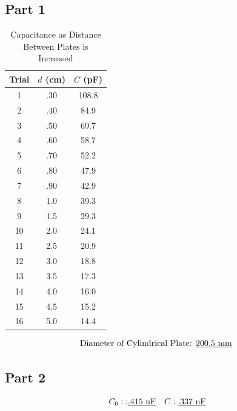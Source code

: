 \documentclass[twocolumn,english]{IEEEtran}
\theoremstyle{plain}
\theoremstyle{plain}
\begin{document}
  \subsection*{\textbf{Part 1}}
  \begin{centering}
  \begin{table}[!htbp]\label{tb:data}
    \caption{Capacitance as Distance Between Plates is Increased}
    \centering{}
    \begin{tabular}{ |c|c|c|}
    \hline
    \textbf{Trial} & \textbf{$d$ (cm)} & \textbf{$C$ (pF)} \\ \hline
    1   & .30  & 108.8  \\ \hline
    2   & .40  & 84.9  \\ \hline
    3   & .50  & 69.7  \\ \hline
    4   & .60  & 58.7  \\ \hline
    5   & .70  & 52.2  \\ \hline
    6   & .80  & 47.9  \\ \hline
    7   & .90  & 42.9  \\ \hline
    8   & 1.0  & 39.3  \\ \hline
    9   & 1.5  & 29.3  \\ \hline
    10  & 2.0  & 24.1  \\ \hline
    11  & 2.5  & 20.9  \\ \hline
    12  & 3.0  & 18.8  \\ \hline
    13  & 3.5  & 17.3  \\ \hline
    14  & 4.0  & 16.0  \\ \hline
    15  & 4.5  & 15.2  \\ \hline
    16  & 5.0  & 14.4  \\ \hline





    \end{tabular}
  \end{table}
  \end{centering}
  \begin{align*}
  \text{Diameter of Cylindrical Plate: \underline{200.5 mm} }
  \end{align*}
  \subsection*{\textbf{Part 2}}
  \begin{align*}
  &C_0: \text{:\underline{.415 nF}} &C: \text{\underline{.337 nF}}
  \end{align*}
\end{document}
